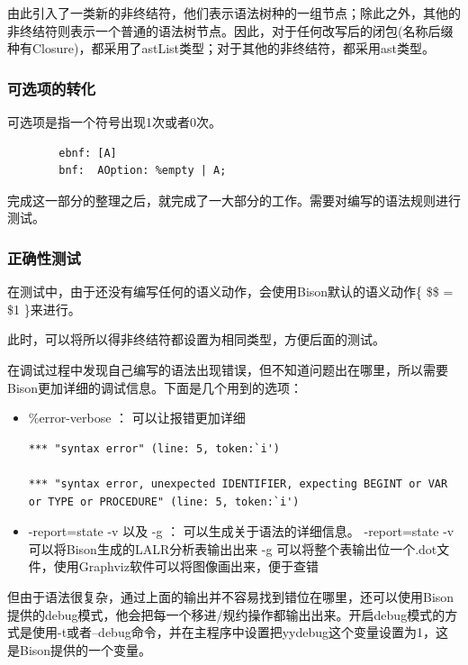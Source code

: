 \documentclass{article}
\begin{document}
	由此引入了一类新的非终结符，他们表示语法树种的一组节点；除此之外，其他的非终结符则表示一个普通的语法树节点。因此，对于任何改写后的闭包(名称后缀种有Closure)，都采用了astList类型；对于其他的非终结符，都采用ast类型。

	\subsubsection*{可选项的转化}
	可选项是指一个符号出现1次或者0次。
	\begin{small}
		\begin{lstlisting}
		ebnf: [A]
		bnf:  AOption: %empty | A;
		\end{lstlisting}
	\end{small}	
	
	完成这一部分的整理之后，就完成了一大部分的工作。需要对编写的语法规则进行测试。
	
	
	\subsubsection{正确性测试}
	在测试中，由于还没有编写任何的语义动作，会使用Bison默认的语义动作\{ \$\$ = \$1 \}来进行。
	
	此时，可以将所以得非终结符都设置为相同类型，方便后面的测试。
		
	在调试过程中发现自己编写的语法出现错误，但不知道问题出在哪里，所以需要Bison更加详细的调试信息。下面是几个用到的选项：
	
	\begin{itemize}
		\item \%error-verbose ： 可以让报错更加详细
		\subitem
		\begin{small}
			\begin{lstlisting}
*** "syntax error" (line: 5, token:`i')

*** "syntax error, unexpected IDENTIFIER, expecting BEGINT or VAR or TYPE or PROCEDURE" (line: 5, token:`i')
			\end{lstlisting}
		\end{small}
	
		\item -report=state -v 以及 -g ： 可以生成关于语法的详细信息。
			\subitem -report=state -v 可以将Bison生成的LALR分析表输出出来
			\subitem -g 可以将整个表输出位一个.dot文件，使用Graphviz软件可以将图像画出来，便于查错
	\end{itemize}
	
	但由于语法很复杂，通过上面的输出并不容易找到错位在哪里，还可以使用Bison提供的debug模式，他会把每一个移进/规约操作都输出出来。开启debug模式的方式是使用-t或者--debug命令，并在主程序中设置把yydebug这个变量设置为1，这是Bison提供的一个变量。
	
\end{document}
